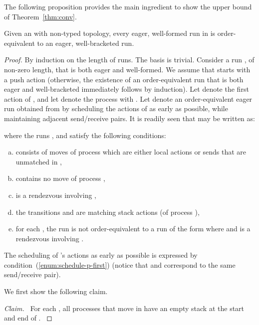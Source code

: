 \documentclass{LMCS}
\newenvironment{proposition}{\begin{prop}}{\end{prop}}
\newenvironment{claim}{\medskip\noindent\textit{Claim.\ }}{\medskip}
\begin{document}
The following proposition provides the main ingredient to show the
 upper bound of Theorem~\ref{thm:conv}.

\begin{proposition} \label{prop:wf-to-wb-for-confluent} Given an \rqcp
   with non-\converging typed topology, every eager,
  well-formed run in  is
  order-equivalent to an eager, well-bracketed run. 
\end{proposition}

\begin{proof}
  By induction on the length of runs.
  The basis is trivial.
  Consider a run , of non-zero length, that is both eager and well-formed.
  We assume that  starts with a push action (otherwise, the existence of an order-equivalent run that is both eager and well-bracketed immediately follows by induction).
  Let  denote the first action of , and let  denote the process with .
Let  denote an order-equivalent eager run obtained from  by scheduling the actions of  as early as possible, while maintaining adjacent send/receive pairs.
  It is readily seen that  may be written as:

  where the runs ,  and  satisfy the
  following conditions:
  \begin{enumerate}[(a)]
  \item\label{enum:decomp-only-p}
     consists of moves of process  which are either
    local actions or
    sends that are unmatched in ,
  \item\label{enum:decomp-only-not-p}
    contains no move of process ,
  \item\label{enum:decomp-sync}
    is a rendezvous involving ,
  \item\label{enum:decomp-wf}
the transitions  and  are matching stack actions (of
  process ), 
  \item\label{enum:schedule-p-first}
    for each , the run  is not
    order-equivalent to a run of the form  where  and  is a
    rendezvous involving .
\end{enumerate}
The scheduling of 's actions as early as possible is expressed by
  condition~(\ref{enum:schedule-p-first}) (notice that  and
   correspond to the same send/receive pair). 
  
  \noindent
  We first show the following claim.

  \begin{claim}
    For each , all processes that move in 
    have an empty stack at the start and end of . 
  \end{claim}


\end{proof}
\end{document}
